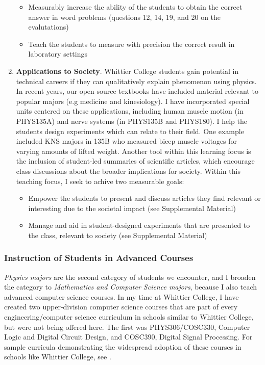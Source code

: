 \documentclass[../../main.tex]{subfiles}
\begin{document}
\begin{enumerate}
\begin{itemize}
\item Measurably increase the ability of the students to obtain the correct answer in word problems (questions 12, 14, 19, and 20 on the evalutations)
\item Teach the students to measure with precision the correct result in laboratory settings 
\end{itemize}

\item \textbf{Applications to Society}. Whittier College students gain potential in technical careers if they can qualitatively explain phenomenon using physics.  In recent years, our open-source textbooks \cite{openstax1} \cite{openstax2} have included material relevant to popular majors (e.g medicine and kinesiology). I have incorporated special units centered on these applications, including human muscle motion (in PHYS135A) and nerve systems (in PHYS135B and PHYS180).  I help the students design experiments which can relate to their field.  One example included KNS majors in 135B who measured bicep muscle voltages for varying amounts of lifted weight.  Another tool within this learning focus is the inclusion of student-led summaries of scientific articles, which encourage class discussions about the broader implications for society.  Within this teaching focus, I seek to achive two measurable goals:

\begin{itemize}
\item Empower the students to present and discuss articles they find relevant or interesting due to the societal impact (see Supplemental Material)
\item Manage and aid in student-designed experiments that are presented to the class, relevant to society (see Supplemental Material)
\end{itemize}

\end{enumerate}

\subsubsection{Instruction of Students in Advanced Courses}

\label{sec:teaching_phil2}

\textit{Physics majors} are the second category of students we encounter, and I broaden the category to \textit{Mathematics and Computer Science majors}, because I also teach advanced computer science courses.  In my time at Whittier College, I have created two upper-division computer science courses that are part of every engineering/computer science curriculum in schools similar to Whittier College, but were not being offered here.  The first was PHYS306/COSC330, Computer Logic and Digital Circuit Design, and COSC390, Digital Signal Processing.  For sample curricula demonstrating the widespread adoption of these courses in schools like Whittier College, see \cite{BiolaCR} \cite{LMUCR}. \\ \hspace{0.1cm}
\end{document}
